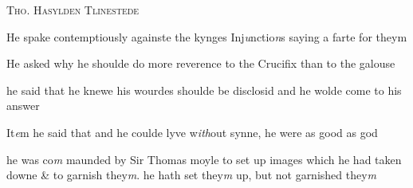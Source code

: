 \documentclass[12pt, a4paper]{book}
\begin{document}
 

               
               	
				\begin{center}  {\scshape Tho. Hasylden Tlinestede}  \end{center}
			
               	
               		
				\marginpar[\vspace{0.5cm}{\textcolor{Gray}{Injunctions n}}]{}
			 
               		
		\ifthenelse{\isodd{\thepage}}
		{\reversemarginpar}
		{\normalmarginpar}
		He spake contemptiously againste the kynges Inj\textit{u}nctio\textit{n}s
  saying a farte for theym
               	
               	
               		
				\marginpar[\vspace{0.5cm}{\textcolor{Gray}{offensive}}]{}
			
               		
		\ifthenelse{\isodd{\thepage}}
		{\reversemarginpar}
		{\normalmarginpar}
		He asked why he shoulde do more reverence to the
               		Crucifix than to the galouse
               		
		\ifthenelse{\isodd{\thepage}}
		{\reversemarginpar}
		{\normalmarginpar}
		 he said that he knewe his wourdes shoulde be disclosid
               			and he wolde come to his answer
               		
		\ifthenelse{\isodd{\thepage}}
		{\reversemarginpar}
		{\normalmarginpar}
		It\textit{e}m he said that and he coulde lyve w\textit{ith}out synne, he were
               			as good as god
               	
		
			
		
 
 
 	
				\marginpar[\vspace{0.5cm}{\textcolor{Gray}{Images}}]{}
			
 	
		\ifthenelse{\isodd{\thepage}}
		{\reversemarginpar}
		{\normalmarginpar}
		he was co\textit{m}
			maunded by Sir Thomas moyle to set up images which he had taken downe \& to garnish they\textit{m}. he hath set they\textit{m }up, but not garnished they\textit{m}
			
 

               
               	
\end{document}
